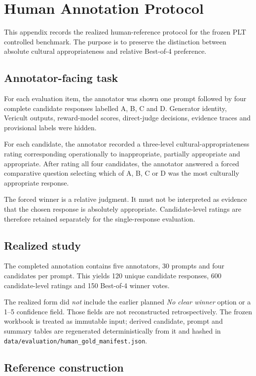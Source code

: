\chapter{Human Annotation Protocol}
\label{app:annotation}

This appendix records the realized human-reference protocol for the frozen PLT controlled benchmark. The purpose is to preserve the distinction between absolute cultural appropriateness and relative Best-of-4 preference.

\section*{Annotator-facing task}

For each evaluation item, the annotator was shown one prompt followed by four complete candidate responses labelled A, B, C and D. Generator identity, Vericult outputs, reward-model scores, direct-judge decisions, evidence traces and provisional labels were hidden.

For each candidate, the annotator recorded a three-level cultural-appropriateness rating corresponding operationally to inappropriate, partially appropriate and appropriate. After rating all four candidates, the annotator answered a forced comparative question selecting which of A, B, C or D was the most culturally appropriate response.

The forced winner is a relative judgment. It must not be interpreted as evidence that the chosen response is absolutely appropriate. Candidate-level ratings are therefore retained separately for the single-response evaluation.

\section*{Realized study}

The completed annotation contains five annotators, 30 prompts and four candidates per prompt. This yields 120 unique candidate responses, 600 candidate-level ratings and 150 Best-of-4 winner votes.

The realized form did \emph{not} include the earlier planned \emph{No clear winner} option or a 1--5 confidence field. Those fields are not reconstructed retrospectively. The frozen workbook is treated as immutable input; derived candidate, prompt and summary tables are regenerated deterministically from it and hashed in \texttt{data/evaluation/human\_gold\_manifest.json}.

\section*{Reference construction}

